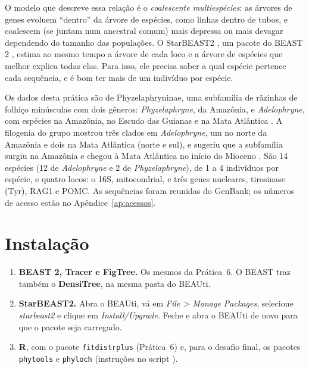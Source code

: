 \documentclass[11pt,a4paper]{article}
\newcommand{\arq}[1]{\path{#1}}
\newcommand{\ui}[1]{\textit{#1}}
\begin{document}
O modelo que descreve essa relação é o \emph{coalescente multiespécies}: as árvores de genes
evoluem ``dentro'' da árvore de espécies, como linhas dentro de tubos, e coalescem (se juntam
num ancestral comum) mais depressa ou mais devagar dependendo do tamanho das populações. O
StarBEAST2 \cite{ogilvie2017}, um pacote do BEAST 2 \cite{bouckaert2019}, estima ao mesmo tempo
a árvore de cada loco e a árvore de espécies que melhor explica todas elas. Para isso, ele
precisa saber a qual espécie pertence cada sequência, e é bom ter mais de um indivíduo por
espécie.

Os dados desta prática são de Phyzelaphryninae, uma subfamília de rãzinhas de
folhiço minúsculas com dois gêneros: \emph{Phyzelaphryne}, da Amazônia, e \emph{Adelophryne}, com
espécies na Amazônia, no Escudo das Guianas e na Mata Atlântica \cite{fouquet2012mpe}. A
filogenia do grupo mostrou três clados em \emph{Adelophryne}, um no norte da Amazônia e dois na
Mata Atlântica (norte e sul), e sugeriu que a subfamília surgiu na Amazônia e chegou à Mata
Atlântica no início do Mioceno \cite{fouquet2012mpe}. São 14
espécies (12 de \emph{Adelophryne} e 2 de \emph{Phyzelaphryne}), de 1 a 4 indivíduos por espécie,
e quatro locos: o 16S, mitocondrial, e três genes nucleares, tirosinase (Tyr), RAG1 e POMC. As
sequências foram reunidas do GenBank; os números de acesso estão no Apêndice~\ref{ap:acessos}.

\section{Instalação}

\begin{enumerate}
\item \textbf{BEAST 2, Tracer e FigTree.} Os mesmos da Prática~6. O BEAST traz também o
\textbf{DensiTree}, na mesma pasta do BEAUti.
\item \textbf{StarBEAST2.} Abra o BEAUti, vá em \ui{File > Manage Packages}, selecione
\ui{starbeast2} e clique em \ui{Install/Upgrade}. Feche e abra o BEAUti de novo para que o
pacote seja carregado.
\item \textbf{R}, com o pacote \texttt{fitdistrplus} (Prática~6) e, para o desafio final, os
pacotes \texttt{phytools} e \texttt{phyloch} (instruções no script \arq{desafio_arvore.R}).
\end{enumerate}
\end{document}
